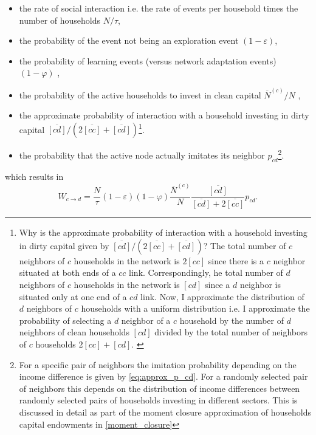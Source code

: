 \begin{itemize}
	\item the rate of social interaction i.e. the rate of events per household times the number of households $N/\tau$,
	\item the probability of the event not being an exploration event $(1-\varepsilon)$,
	\item the probability of learning events (versus network adaptation events) $(1-\varphi)$ ,
        \item the probability of the active households to invest in clean capital $\overbar{N}^{(c)}/N$ ,
        \item the approximate probability of interaction with a household investing in dirty capital $\overbar{[cd]}/(2\overbar{[cc]} + \overbar{[cd]})$\footnote{
            Why is the approximate probability of interaction with a household investing in dirty capital given by $\overbar{[cd]}/(2\overbar{[cc]} + \overbar{[cd]})$? The total number of $c$ neighbors of $c$ households in the network is $2[cc]$ since there is a $c$ neighbor situated at both ends of a $cc$ link. Correspondingly, he total number of $d$ neighbors of $c$ households in the network is $[cd]$ since a $d$ neighbor is situated only at one end of a $cd$ link. Now, I approximate the distribution of $d$ neighbors of $c$ households with a uniform distribution i.e. I approximate the probability of selecting a $d$ neighbor of a $c$ household by the number of $d$ neighbors of clean households $[cd]$ divided by the total number of neighbors of $c$ households $2[cc] + [cd]$. \label{fn:uniform_neighbors} 
          }. 
        \item the probability that the active node actually imitates its neighbor $p_{cd}$\footnote{For a specific pair of neighbors the imitation probability depending on the income difference is given by \cref{eq:approx_p_cd}. For a randomly selected pair of neighbors this depends on the distribution of income differences between randomly selected pairs of households investing in different sectors. This is discussed in detail as part of the moment closure approximation of households capital endowments in \cref{moment_closure}}.
\end{itemize}
which results in 
\begin{equation}
  W_{c \rightarrow d} = \frac{N}{\tau} (1-\varepsilon) (1 - \varphi) \frac{\overbar{N}^{(c)}}{N}\frac{\overbar{[cd]}}{\overbar{[cd]} + 2 \overbar{[cc]}}p_{cd}.
	\label{eq:cdswitchingprob}
\end{equation}

